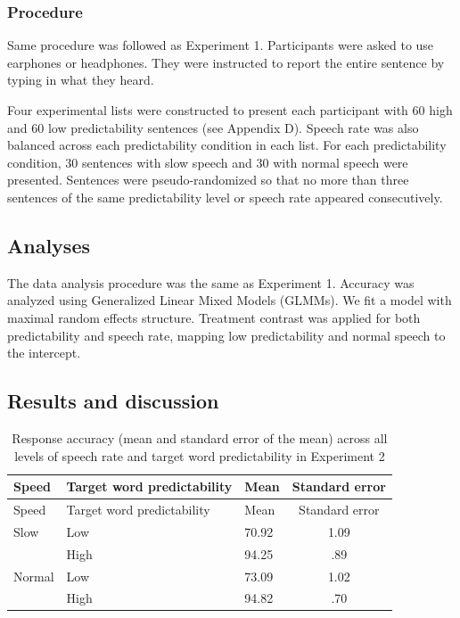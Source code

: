 \documentclass[a4paper, nobind]{templates/ociamthesis}
\begin{document}
\hypertarget{procedure-4}{%
\subsubsection{Procedure}\label{procedure-4}}

Same procedure was followed as Experiment 1.
Participants were asked to use earphones or headphones.
They were instructed to report the entire sentence by typing in what they heard.

Four experimental lists were constructed to present each participant with 60 high and 60 low predictability sentences (see Appendix D).
Speech rate was also balanced across each predictability condition in each list. For each predictability condition, 30 sentences with slow speech and 30 with normal speech were presented.
Sentences were pseudo-randomized so that no more than three sentences of the same predictability level or speech rate appeared consecutively.

\hypertarget{analyses-4}{%
\subsection{Analyses}\label{analyses-4}}

The data analysis procedure was the same as Experiment 1.
Accuracy was analyzed using Generalized Linear Mixed Models (GLMMs).
We fit a model with maximal random effects structure.
Treatment contrast was applied for both predictability and speech rate, mapping low predictability and normal speech to the intercept.

\hypertarget{results-and-discussion-4}{%
\subsection{Results and discussion}\label{results-and-discussion-4}}

\begin{longtable}[]{@{}lllc@{}}
\caption{Response accuracy (mean and standard error of the mean) across all levels of speech rate and target word predictability in Experiment 2}
\label{summary3b}
\tabularnewline
\toprule
Speed & Target word predictability & Mean & Standard
error \\
\midrule
\endfirsthead
\toprule
Speed & Target word predictability & Mean & Standard
error \\
\midrule
\endhead
Slow & Low & 70.92 & 1.09 \\
& High & 94.25 & .89 \\
Normal & Low & 73.09 & 1.02 \\
& High & 94.82 & .70 \\
\bottomrule
\end{longtable}
\end{document}
